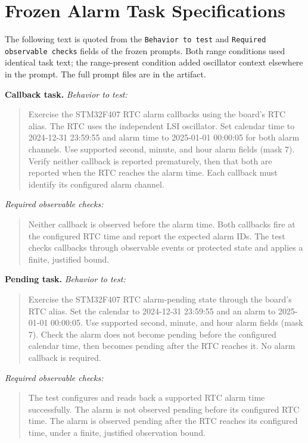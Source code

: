 \section{Frozen Alarm Task Specifications}\label{app:specs}
The following text is quoted from the \texttt{Behavior to test} and \texttt{Required observable checks} fields of the frozen prompts. Both range conditions used identical task text; the range-present condition added oscillator context elsewhere in the prompt. The full prompt files are in the artifact.

\textbf{Callback task.} \emph{Behavior to test:}
\begin{quote}\small
Exercise the STM32F407 RTC alarm callbacks using the board's RTC alias. The RTC uses the independent LSI oscillator. Set calendar time to 2024-12-31 23:59:55 and alarm time to 2025-01-01 00:00:05 for both alarm channels. Use supported second, minute, and hour alarm fields (mask 7). Verify neither callback is reported prematurely, then that both are reported when the RTC reaches the alarm time. Each callback must identify its configured alarm channel.
\end{quote}
\emph{Required observable checks:}
\begin{quote}\small
Neither callback is observed before the alarm time. Both callbacks fire at the configured RTC time and report the expected alarm IDs. The test checks callbacks through observable events or protected state and applies a finite, justified bound.
\end{quote}

\textbf{Pending task.} \emph{Behavior to test:}
\begin{quote}\small
Exercise the STM32F407 RTC alarm-pending state through the board's RTC alias. Set the calendar to 2024-12-31 23:59:55 and an alarm to 2025-01-01 00:00:05. Use supported second, minute, and hour alarm fields (mask 7). Check the alarm does not become pending before the configured calendar time, then becomes pending after the RTC reaches it. No alarm callback is required.
\end{quote}
\emph{Required observable checks:}
\begin{quote}\small
The test configures and reads back a supported RTC alarm time successfully. The alarm is not observed pending before its configured RTC time. The alarm is observed pending after the RTC reaches its configured time, under a finite, justified observation bound.
\end{quote}


